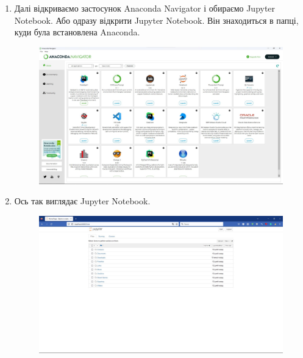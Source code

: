 \documentclass[a4paper,12pt]{article}
\begin{document}
\begin{enumerate}
\begin{figure}[h!]
\begin{center}
            \end{center}
        \end{figure}
\newpage
        \item Далі відкриваємо застосунок Anaconda Navigator і обираємо Jupyter Notebook. Або одразу відкрити Jupyter Notebook. Він знаходиться в папці, 
        куди була встановлена Anaconda.
        \begin{figure}[h!]
            \begin{center}
                \includegraphics[scale=0.35]{Prt sc/Figure_3.jpg}
            \end{center}
        \end{figure}
        \item Ось так виглядає Jupyter Notebook.
        \begin{figure}[h!]
            \begin{center}
                \includegraphics[scale=0.35]{Prt sc/Figure_4.jpg}
            \end{center}
        \end{figure}
    \end{enumerate}
\newpage
\end{document}
